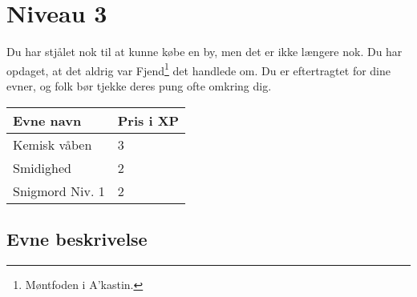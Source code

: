 \chapter*{Niveau 3}
Du har stjålet nok til at kunne købe en by, men det er ikke længere nok. Du har opdaget, at det aldrig var Fjend\footnote{Møntfoden i A'kastin.} det handlede om. Du er eftertragtet for dine evner, og folk bør tjekke deres pung ofte omkring dig. 
\begin{table}[H]
    \centering
    \begin{tabular}{|p{}|p{}|}
    \rowcolor{cerulean!80}\hline
        Evne navn & Pris i XP \\\hline
        Kemisk våben & 3\\\hline
        Smidighed & 2\\\hline
        Snigmord Niv. 1 & 2\\
         \hline
    \end{tabular}
\end{table}
\section*{Evne beskrivelse}






